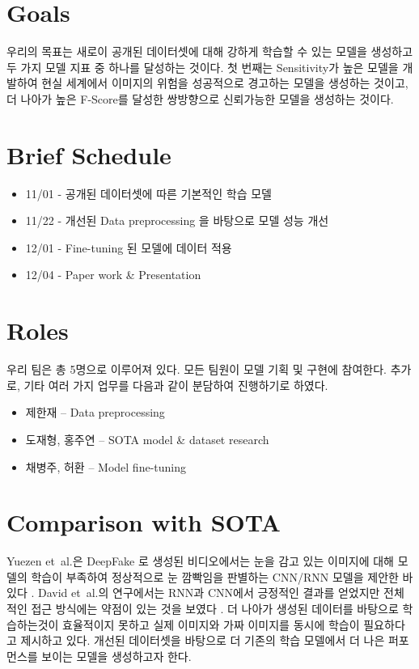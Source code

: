 \documentclass{article}
\begin{document}
\section{Goals}

우리의 목표는 새로이 공개된 데이터셋에 대해 강하게 학습할 수 있는 모델을 생성하고 두 가지 모델 지표 중 하나를 달성하는 것이다. 첫 번째는 Sensitivity가 높은 모델을 개발하여 현실 세계에서 이미지의 위험을 성공적으로 경고하는 모델을 생성하는 것이고, 더 나아가 높은 F-Score를 달성한 쌍방향으로 신뢰가능한 모델을 생성하는 것이다.

\section{Brief Schedule}

\begin{itemize}
	\item 11/01 - 공개된 데이터셋에 따른 기본적인 학습 모델
	\item 11/22 - 개선된 Data preprocessing 을 바탕으로 모델 성능 개선
	\item 12/01 - Fine-tuning 된 모델에 데이터 적용
	\item 12/04 - Paper work \& Presentation
\end{itemize}

\section{Roles}

우리 팀은 총 5명으로 이루어져 있다. 모든 팀원이 모델 기획 및 구현에 참여한다. 추가로, 기타 여러 가지 업무를 다음과 같이 분담하여 진행하기로 하였다.
\begin{itemize}
	\item 제한재 -- Data preprocessing
	\item 도재형, 홍주연 -- SOTA model \& dataset research
	\item 채병주, 허환 -- Model fine-tuning
\end{itemize}

\section{Comparison with SOTA}

Yuezen et~al.은 DeepFake 로 생성된 비디오에서는 눈을 감고 있는 이미지에 대해 모델의 학습이 부족하여 정상적으로 눈 깜빡임을 판별하는 CNN/RNN 모델을 제안한 바 있다 . David et~al.의 연구에서는 RNN과 CNN에서 긍정적인 결과를 얻었지만 전체적인 접근 방식에는 약점이 있는 것을 보였다 . 더 나아가 생성된 데이터를 바탕으로 학습하는것이 효율적이지 못하고 실제 이미지와 가짜 이미지를 동시에 학습이 필요하다고 제시하고 있다. 개선된 데이터셋을 바탕으로 더 기존의 학습 모델에서 더 나은 퍼포먼스를 보이는 모델을 생성하고자 한다.






\end{document}
